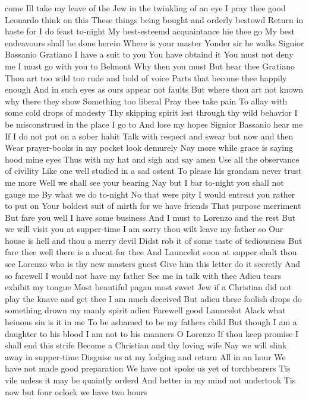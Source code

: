 come Ill take my leave of the Jew in the twinkling of an eye
I pray thee good Leonardo think on this
These things being bought and orderly bestowd
Return in haste for I do feast to-night
My best-esteemd acquaintance hie thee go
My best endeavours shall be done herein
Where is your master
Yonder sir he walks
Signior Bassanio
Gratiano
I have a suit to you
You have obtaind it
You must not deny me I must go with you to Belmont
Why then you must But hear thee Gratiano
Thou art too wild too rude and bold of voice
Parts that become thee happily enough
And in such eyes as ours appear not faults
But where thou art not known why there they show
Something too liberal Pray thee take pain
To allay with some cold drops of modesty
Thy skipping spirit lest through thy wild behavior
I be misconstrued in the place I go to
And lose my hopes
Signior Bassanio hear me
If I do not put on a sober habit
Talk with respect and swear but now and then
Wear prayer-books in my pocket look demurely
Nay more while grace is saying hood mine eyes
Thus with my hat and sigh and say amen
Use all the observance of civility
Like one well studied in a sad ostent
To please his grandam never trust me more
Well we shall see your bearing
Nay but I bar to-night you shall not gauge me
By what we do to-night
No that were pity
I would entreat you rather to put on
Your boldest suit of mirth for we have friends
That purpose merriment But fare you well
I have some business
And I must to Lorenzo and the rest
But we will visit you at supper-time
I am sorry thou wilt leave my father so
Our house is hell and thou a merry devil
Didst rob it of some taste of tediousness
But fare thee well there is a ducat for thee
And Launcelot soon at supper shalt thou see
Lorenzo who is thy new masters guest
Give him this letter do it secretly
And so farewell I would not have my father
See me in talk with thee
Adieu tears exhibit my tongue Most beautiful
pagan most sweet Jew if a Christian did not play
the knave and get thee I am much deceived But
adieu these foolish drops do something drown my
manly spirit adieu
Farewell good Launcelot
Alack what heinous sin is it in me
To be ashamed to be my fathers child
But though I am a daughter to his blood
I am not to his manners O Lorenzo
If thou keep promise I shall end this strife
Become a Christian and thy loving wife
Nay we will slink away in supper-time
Disguise us at my lodging and return
All in an hour
We have not made good preparation
We have not spoke us yet of torchbearers
Tis vile unless it may be quaintly orderd
And better in my mind not undertook
Tis now but four oclock we have two hours
